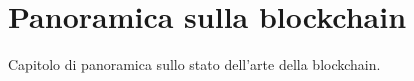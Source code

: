 \chapter{Panoramica sulla blockchain}

Capitolo di panoramica sullo stato dell'arte della blockchain.
